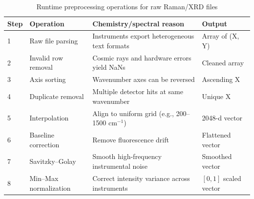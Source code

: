 \begin{table}[htbp]
\caption{Runtime preprocessing operations for raw Raman/XRD files}
\label{tab:preprocessing}
\centering

\begin{tabular}{llll}
\toprule
\textbf{Step} & \textbf{Operation} & \textbf{Chemistry/spectral reason} & \textbf{Output} \\
\midrule
1 & Raw file parsing & Instruments export heterogeneous text formats & Array of (X, Y) \\
2 & Invalid row removal & Cosmic rays and hardware errors yield NaNs & Cleaned array \\
3 & Axis sorting & Wavenumber axes can be reversed & Ascending X \\
4 & Duplicate removal & Multiple detector hits at same wavenumber & Unique X \\
5 & Interpolation & Align to uniform grid (e.g., 200--1500 cm$^{-1}$) & 2048-d vector \\
6 & Baseline correction & Remove fluorescence drift \cite{baek2015arpls} & Flattened vector \\
7 & Savitzky--Golay & Smooth high-frequency instrumental noise & Smoothed vector \\
8 & Min--Max normalization & Correct intensity variance across instruments & $[0, 1]$ scaled vector \\
\bottomrule
\end{tabular}

\end{table}
